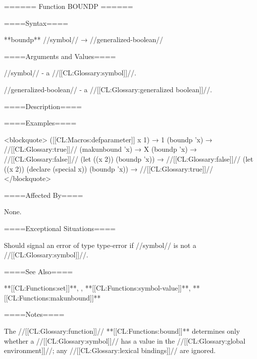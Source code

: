 ====== Function BOUNDP ======

====Syntax====

**boundp** //symbol// → //generalized-boolean//

====Arguments and Values====

//symbol// - a //[[CL:Glossary:symbol]]//.

//generalized-boolean// - a //[[CL:Glossary:generalized boolean]]//.

====Description====


====Examples====

<blockquote> ([[CL:Macros:defparameter]] x 1) → 1 (boundp 'x) → //[[CL:Glossary:true]]// (makunbound 'x) → X (boundp 'x) → //[[CL:Glossary:false]]// (let ((x 2)) (boundp 'x)) → //[[CL:Glossary:false]]// (let ((x 2)) (declare (special x)) (boundp 'x)) → //[[CL:Glossary:true]]// </blockquote>

====Affected By====

None.

====Exceptional Situations====

Should signal an error of type type-error if //symbol// is not a //[[CL:Glossary:symbol]]//.

====See Also====

**[[CL:Functions:set]]**, , **[[CL:Functions:symbol-value]]**, **[[CL:Functions:makunbound]]**

====Notes====

The //[[CL:Glossary:function]]// **[[CL:Functions:bound]]** determines only whether a //[[CL:Glossary:symbol]]// has a value in the //[[CL:Glossary:global environment]]//; any //[[CL:Glossary:lexical bindings]]// are ignored.

